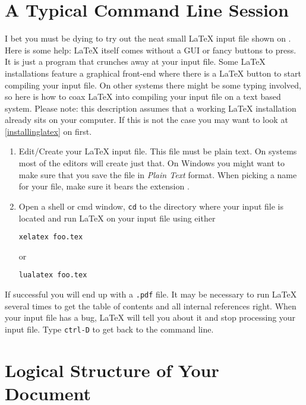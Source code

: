 \section{A Typical Command Line Session}

I bet you must be dying to try out the neat small \LaTeX{} input file shown on
. Here is some help: \LaTeX{} itself comes without a GUI or
fancy buttons to press. It is just a program that crunches away at your input
file. Some \LaTeX{} installations feature a graphical front-end where there is
a \LaTeX{} button to start compiling your input file. On other systems there
might be some typing involved, so here is how to coax \LaTeX{} into compiling
your input file on a text based system. Please note: this description assumes
that a working \LaTeX{} installation already sits on your computer. If this is
not the case you may want to look at \autoref{installinglatex} on
 first.

\begin{enumerate}
  \item Edit/Create your \LaTeX{} input file. This file must be plain text.  On
        \Unix{} systems most of the editors will create just that. On Windows
        you might want to make sure that you save the file in \emph{Plain Text}
        format. When picking a name for your file, make sure it bears the
        extension .

  \item Open a shell or cmd window, \texttt{cd} to the directory where your
        input file is located and run \LaTeX{} on your input file using either
        \begin{lscommand}
          \verb+xelatex foo.tex+
        \end{lscommand}
        or
        \begin{lscommand}
          \verb+lualatex foo.tex+
        \end{lscommand}
\end{enumerate}

If successful you will end up with a \texttt{.pdf} file. It may be necessary to
run \LaTeX{} several times to get the table of contents and all internal
references right. When your input file has a bug, \LaTeX{} will tell you about
it and stop processing your input file. Type \texttt{ctrl-D} to get back to the
command line.

\section{Logical Structure of Your Document}

